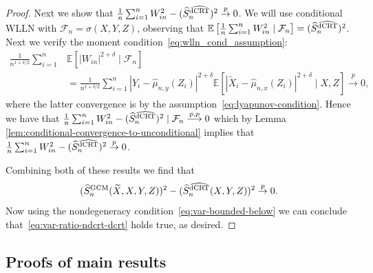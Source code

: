 \documentclass[aos]{imsart}
\theoremstyle{plain}
\theoremstyle{remark}
\newcommand{\E}{\mathbb E}								%
\newcommand{\convp}{\overset p \rightarrow}             %
\newcommand{\srx}{X}									%
\newcommand{\srz}{Z}									%
\newcommand{\srxk}{\widetilde X}						%
\newcommand{\sry}{Y}									%
\newcommand{\GCM}{\textnormal{GCM}}						%
\newcommand{\dCRThat}{\widehat{\textnormal{dCRT}}}		%
\newcommand{\convpp}{\overset {p,p} \longrightarrow}    %
\begin{document}
\begin{proof}
	Next we show that $\frac{1}{n} \sum_{i=1}^n W^2_{in} - (\widehat S_{n}^{\dCRThat})^2 \convp 0$. We will use conditional WLLN with $\mathcal{F}_n = \sigma(\srx,\sry,\srz)$, observing that $\E\left[\frac{1}{n} \sum_{i=1}^n W^2_{in} \mid \mathcal{F}_n\right] = (\widehat S_{n}^{\dCRThat})^2 $. Next we verify the moment condition~\eqref{eq:wlln_cond_assumption}:
	\begin{align}
		\frac{1}{n^{1+\delta/2}} \sum_{i = 1}^n &\E[|W_{in}|^{2+\delta} \mid \mathcal{F}_n] \\&= \frac{1}{n^{1+\delta/2}} \sum_{i=1}^n |\sry_i-\widehat\mu_{n,y}(\srz_i)|^{2+\delta}\E\left[|\srxk_i-\widehat\mu_{n,x}(\srz_i)|^{2+\delta}\mid \srx,\srz\right] \convp 0,
	\end{align} 
	where the latter convergence is by the assumption~\eqref{eq:lyapunov-condition}.
	Hence we have that $\frac{1}{n} \sum_{i = 1}^n W^2_{in} - (\widehat S_{n}^{\dCRThat})^2  \mid \mathcal F_n \convpp 0$ which by Lemma \ref{lem:conditional-convergence-to-unconditional} implies that $\frac{1}{n} \sum_{i=1}^n W^2_{in} - (\widehat S_{n}^{\dCRThat})^2 \convp 0$.
	
	Combining both of these results we find that 
	\begin{equation*}
		(\widehat S_{n}^{\GCM}(\srxk, \srx, \sry, \srz))^2 - (\widehat S_{n}^{\dCRThat}(\srx, \sry, \srz))^2 \convp 0. 
	\end{equation*}
	Now using the nondegeneracy condition~\eqref{eq:var-bounded-below} we can conclude that~\eqref{eq:var-ratio-ndcrt-dcrt} holds true, as desired.
\end{proof}


\subsection{Proofs of main results}
\end{document}

